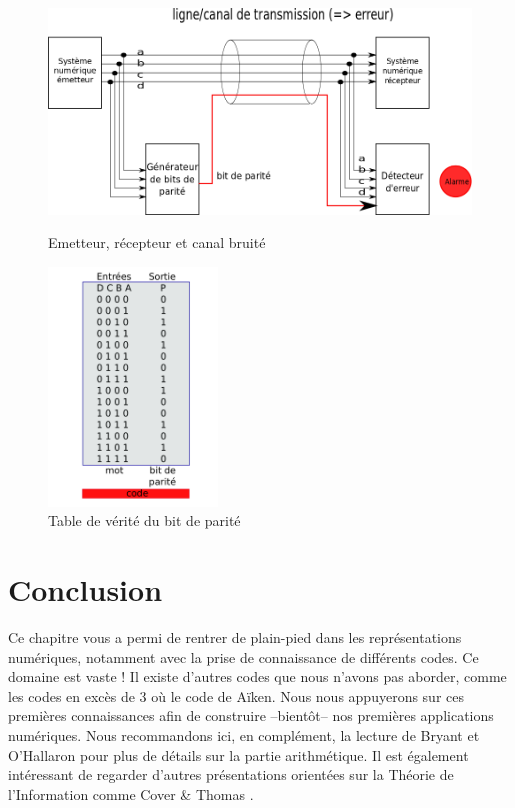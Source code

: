 \begin{figure}[htb!]
    \centering
    \begin{minipage}{0.45\textwidth}
        \centering
        \includegraphics[width=1.1\textwidth]{./figures/parite-1.png} %
        \caption{Emetteur, récepteur et canal bruité}
    \end{minipage}\hfill
    \begin{minipage}{0.45\textwidth}
        \centering
        \includegraphics[width=0.4\textwidth]{./figures/parite-3.png} %
        \caption{Table de vérité du bit de parité}
    \end{minipage}
\end{figure}


\section{Conclusion}
Ce chapitre vous a permi de rentrer de plain-pied dans les représentations numériques,
notamment avec la prise de connaissance de différents codes. Ce domaine est vaste ! Il existe d'autres codes
que nous n'avons pas aborder, comme les codes en excès de 3 où le code de Aïken.
Nous nous appuyerons sur ces premières connaissances afin de construire --bientôt-- nos
premières applications numériques.
Nous recommandons ici, en complément, la lecture de Bryant et O'Hallaron \cite{Bryant:2010:CSP:1841497} pour plus de détails sur la partie arithmétique.
Il est également intéressant de regarder d'autres présentations orientées sur la Théorie de l'Information comme Cover \& Thomas \cite{Cover:2006:EIT:1146355}.
